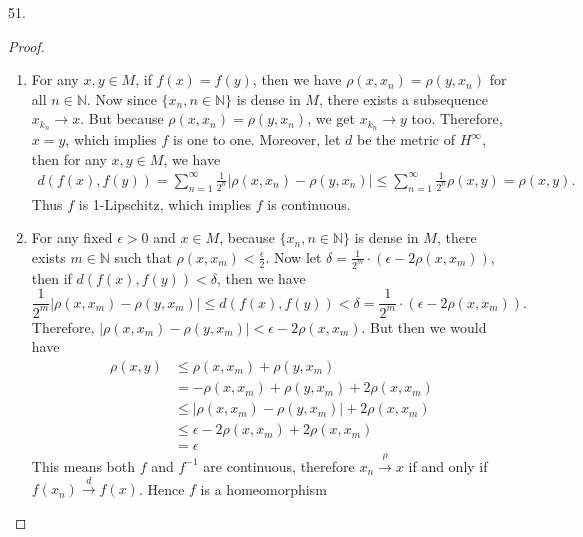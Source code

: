 \documentclass[12pt, a4paper]{article}
\theoremstyle{plain}
\newcommand{\N}{\mathbb{N}}
\begin{document}
\pagebreak

51.
\begin{proof}
\hfill
\begin{enumerate}[label=(\roman*)]
\item For any $x,y\in M$, if $f(x)=f(y)$, then we have $\rho(x,x_n)=\rho(y,x_n)$ for all $n\in\N$. Now since $\{x_n,n\in\N\}$ is dense in $M$, there exists a subsequence $x_{k_n}\rightarrow x$. But because $\rho(x,x_n)=\rho(y,x_n)$, we get $x_{k_n}\rightarrow y$ too. Therefore, $x=y$, which implies $f$ is one to one. Moreover, let $d$ be the metric of $H^\infty$, then for any $x,y\in M$, we have
\begin{align*}
d(f(x),f(y))=\sum_{n=1}^{\infty}{\frac{1}{2^n}|\rho(x,x_n)-\rho(y,x_n)|}\leq \sum_{n=1}^{\infty}{\frac{1}{2^n}\rho(x,y)}=\rho(x,y).
\end{align*}
Thus $f$ is 1-Lipschitz, which implies $f$ is continuous.
\item For any fixed $\epsilon>0$ and $x\in M$, because $\{x_n,n\in\N\}$ is dense in $M$, there exists $m\in \N$ such that $\rho(x,x_m)<\frac{\epsilon}{2}$. Now let $\delta = \frac{1}{2^m}\cdot (\epsilon -2\rho(x,x_m))$, then if $d(f(x),f(y))<\delta$, then we have
\[
\frac{1}{2^m}|\rho(x,x_m)-\rho(y,x_m)|\leq d(f(x),f(y))<\delta=\frac{1}{2^m}\cdot (\epsilon -2\rho(x,x_m)).
\]
Therefore, $|\rho(x,x_m)-\rho(y,x_m)|<\epsilon -2\rho(x,x_m)$. But then we would have
\begin{align*}
\rho(x,y)&\leq \rho(x,x_m)+\rho(y,x_m)\\
&=-\rho(x,x_m)+\rho(y,x_m)+2\rho(x,x_m)\\
&\leq |\rho(x,x_m)-\rho(y,x_m)|+2\rho(x,x_m)\\
&\leq \epsilon -2\rho(x,x_m)+2\rho(x,x_m)\\
&=\epsilon
\end{align*}
This means both $f$ and $f^{-1}$ are continuous, therefore $x_n\xrightarrow{\rho} x$ if and only if $f(x_n)\xrightarrow{d} f(x)$. Hence $f$ is a homeomorphism
\end{enumerate}
\end{proof}
\end{document}
